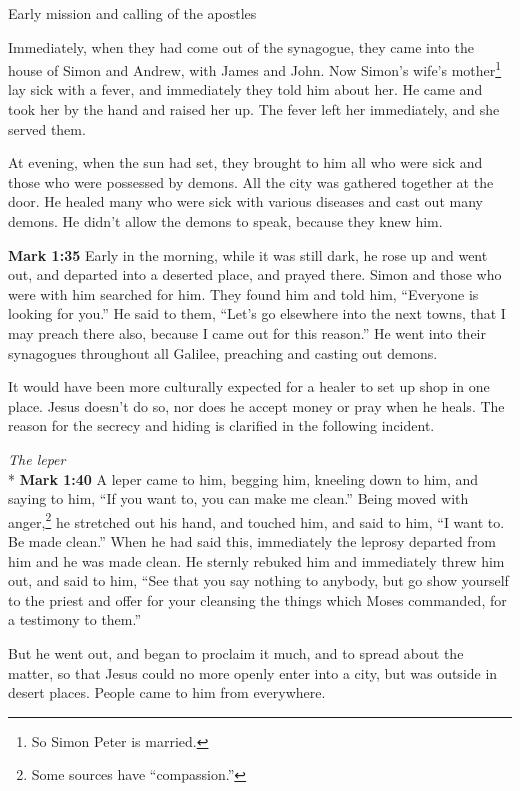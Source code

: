 \documentclass[10pt,twoside]{article} %
\newcommand{\doimage}[2]{\texttt{[image: \#2]}\label{fig:#2}}
\newcommand{\figbasic}[4]{ %
    \ifthenelse{\isodd{\pageref{fig:#2}}}{}{\hfill}
    \ifstrempty{#3}{
      \doimage{#1}{#2}
    }{
      \makebox{\doimage{#1}{#2} \\ #3}
    }
    \ifthenelse{\isodd{\pageref{fig:#2}}}{\hfill}{}
    \par
}
\newcommand{\fig}[2][0.4]{
  \figbasic{#1}{#2}{}{}
}
\newcommand{\quotesize}{\normalsize{}}
\newcommand{\comm}[1]{\begingroup \color{black!50} #1\endgroup}
\newenvironment{quotetext}{\begingroup\quotesize}{\endgroup}
\newcommand{\intex}[1]{\index[texts]{#1}}
\newcommand{\bible}[2]{\begin{quotetext}\textbf{#1}\intex{#1} #2\end{quotetext}}
\newcommand{\gospelmark}[2]{\bible{Mark #1}{#2}}
\newcommand{\subhead}[1]{\emph{#1}\\*}
\begin{document}
\begin{section}{Early mission and calling of the apostles}
{  Immediately, when they had come out of the synagogue, they came into the house of Simon and Andrew, with James and John.
   Now Simon's wife's mother\footnote{So Simon Peter is married.} lay sick with a fever, and immediately they told him about her.   He came and took her by the hand and raised her up. The fever left her immediately, and she served them.

  At evening, when the sun had set, they brought to him all who were sick and those who were possessed by demons.   All the city was gathered together at the door.   He healed many who were sick with various diseases and cast out many demons. He didn't allow the demons to speak, because they knew him.}

\fig[0.6]{driving-out-demons}

\gospelmark{1:35}{Early in the morning, while it was still dark, he rose up and went out, and departed into a deserted place, and prayed there.   Simon and those who were with him searched for him.   They found him and told him, ``Everyone is looking for you.''
  He said to them, ``Let's go elsewhere into the next towns, that I may preach there also, because I came out for this reason.''   He went into their synagogues throughout all Galilee, preaching and casting out demons.}

\comm{
It would have been more culturally expected for a healer to set up shop in one place. Jesus doesn't do so, nor does
he accept money or pray when he heals. The reason for the secrecy and hiding is clarified in the following incident.
}

\subhead{The leper}
%
\gospelmark{1:40}{A leper came to him, begging him, kneeling down to him, and saying to him, ``If you want to, you can make me clean.''
  Being moved with anger,\footnote{Some sources have ``compassion.''} he stretched out his hand, and touched him, and said to him, ``I want to. Be made clean.''   When he had said this, immediately the leprosy departed from him and he was made clean.
He sternly rebuked him and immediately threw him out,   and said to him, ``See that you say nothing to anybody, but go show yourself to the priest and offer for your cleansing the things which Moses commanded, for a testimony to them.''

  But he went out, and began to proclaim it much, and to spread about the matter, so that Jesus could no more openly enter into a city, but was outside in desert places. People came to him from everywhere. }




\end{section}
\end{document}
